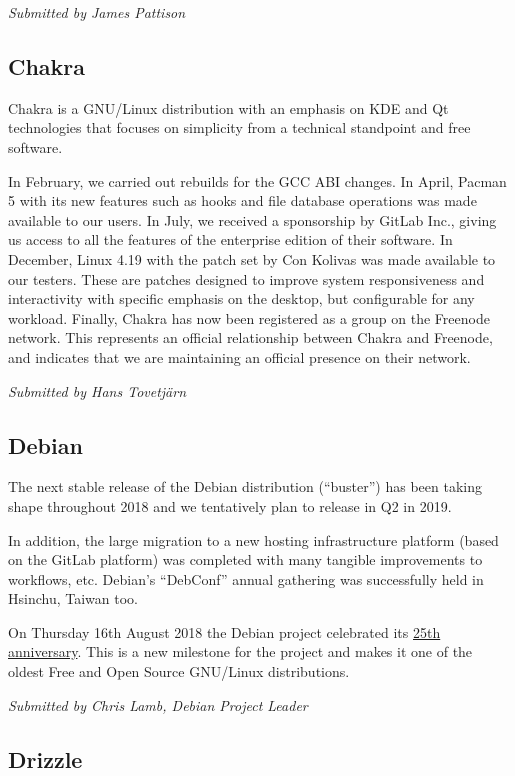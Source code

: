 \documentclass[a4paper]{report}
\begin{document}
{\em Submitted by James Pattison}

\subsection{Chakra}

Chakra is a GNU/Linux distribution with an emphasis on KDE and Qt
technologies that focuses on simplicity from a technical standpoint and
free software.

In February, we carried out rebuilds for the GCC ABI changes. In April,
Pacman 5 with its new features such as hooks and file database
operations was made available to our users. In July, we received a
sponsorship by GitLab Inc., giving us access to all the features of the
enterprise edition of their software. In December, Linux 4.19 with the
patch set by Con Kolivas was made available to our testers. These are
patches designed to improve system responsiveness and interactivity with
specific emphasis on the desktop, but configurable for any workload.
Finally, Chakra has now been registered as a group on the Freenode
network. This represents an official relationship between Chakra and
Freenode, and indicates that we are maintaining an official presence on
their network.

{\em Submitted by Hans Tovetjärn}

\subsection{Debian}

The next stable release of the Debian distribution (``buster'') has been
taking shape throughout 2018 and we tentatively plan to release in Q2 in
2019.

In addition, the large migration to a new hosting infrastructure
platform (based on the GitLab platform) was completed with many tangible
improvements to workflows, etc.  Debian's ``DebConf'' annual gathering
was successfully held in Hsinchu, Taiwan too.

On Thursday 16th August 2018 the Debian project celebrated its
\href{https://bits.debian.org/2018/08/debian-is-25.html}{25th
anniversary}.  This is a new milestone for the project and makes it one
of the oldest Free and Open Source GNU/Linux distributions.

{\em Submitted by Chris Lamb, Debian Project Leader}

\subsection{Drizzle}
\end{document}
